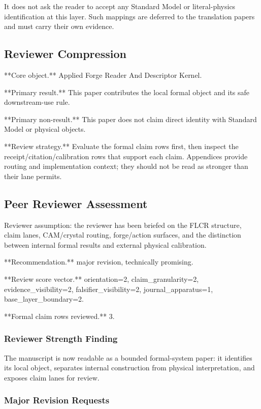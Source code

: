 \documentclass[11pt]{article}
\begin{document}
It does not ask the reader to accept any Standard Model or literal-physics identification at this layer. Such mappings are deferred to the translation papers and must carry their own evidence.

\subsection*{Reviewer Compression}

**Core object.** Applied Forge Reader And Descriptor Kernel.

**Primary result.** This paper contributes the local formal object and its safe downstream-use rule.

**Primary non-result.** This paper does not claim direct identity with Standard Model or physical objects.

**Review strategy.** Evaluate the formal claim rows first, then inspect the receipt/citation/calibration rows that support each claim. Appendices provide routing and implementation context; they should not be read as stronger than their lane permits.

\subsection*{Peer Reviewer Assessment}

Reviewer assumption: the reviewer has been briefed on the FLCR structure, claim lanes, CAM/crystal routing, forge/action surfaces, and the distinction between internal formal results and external physical calibration.

**Recommendation.** major revision, technically promising.

**Review score vector.** orientation=2, claim\_granularity=2, evidence\_visibility=2, falsifier\_visibility=2, journal\_apparatus=1, base\_layer\_boundary=2.

**Formal claim rows reviewed.** 3.

\subsubsection*{Reviewer Strength Finding}

The manuscript is now readable as a bounded formal-system paper: it identifies its local object, separates internal construction from physical interpretation, and exposes claim lanes for review.

\subsubsection*{Major Revision Requests}
\end{document}
